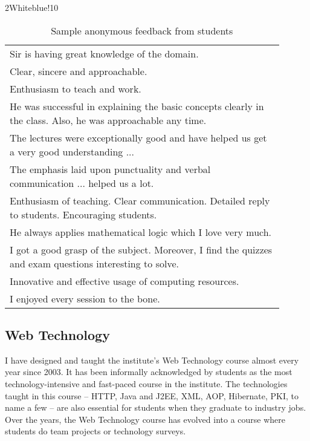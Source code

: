 \documentclass[titlepage, %
11pt, 
]{article}
\begin{document}
\begin{table}
\begin{minipage}{1.0\linewidth}
\rowcolors%
{2}{White}{blue!10}
\setlength\extrarowheight{4pt}
\begin{tabular}%
{|p{0.90\linewidth}|}
\hline
\multicolumn{1}{|m{0.90\linewidth}|}{\centering {\bf Comments}}\\
\hline
Sir is having great knowledge of the domain.\\
Clear, sincere and approachable.\\
Enthusiasm to teach and work.\\
He was successful in explaining the basic concepts clearly in the class.  Also, he was approachable any time.\\
The lectures were exceptionally good and have helped us get a very good understanding ...\\
The emphasis laid upon punctuality and verbal communication ... helped us a lot.\\
Enthusiasm of teaching.  Clear communication.  Detailed reply to students.  Encouraging students.\\
He always applies mathematical logic which I love very much.\\
I got a good grasp of the subject.  Moreover, I find the quizzes and exam questions interesting to solve. \\
Innovative and effective usage of computing resources.\\
I enjoyed every session to the bone.\\
\hline
\end{tabular}
\end{minipage}
\caption{Sample anonymous feedback from students\label{tbl:feedback}}
\end{table}


\subsection{Web Technology}
\label{subsec:webtech}
I have designed and taught the institute's Web Technology
course almost every year since 2003.  It has been informally
acknowledged by students as the most technology-intensive
and fast-paced course in the institute.  The technologies
taught in this course -- HTTP, Java and J2EE, XML, AOP,
Hibernate, PKI, to name a few -- are also essential for
students when they graduate to industry jobs.  Over the
years, the Web Technology course has evolved into a course
where students do team projects or technology surveys.
\end{document}
